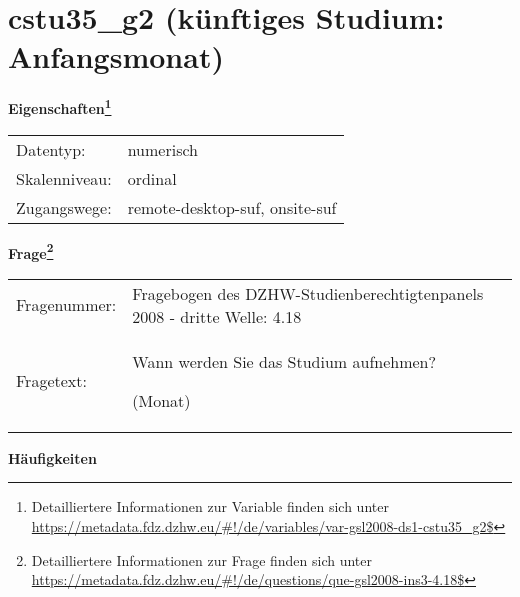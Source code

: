 
    \setcounter{footnote}{0}

    \vspace*{-1.8cm}
	\section{cstu35\_g2 (künftiges Studium: Anfangsmonat)}
	\label{section:cstu35_g2}



    \vspace*{0.5cm}
    \noindent\textbf{Eigenschaften\footnote{Detailliertere Informationen zur Variable finden sich unter
		\url{https://metadata.fdz.dzhw.eu/\#!/de/variables/var-gsl2008-ds1-cstu35_g2$}}}\\
	\begin{tabularx}{\hsize}{@{}lX}
	Datentyp: & numerisch \\
	Skalenniveau: & ordinal \\
	Zugangswege: &
	  remote-desktop-suf, 
	  onsite-suf
 \\
    \end{tabularx}



				\vspace*{0.5cm}
                \noindent\textbf{Frage\footnote{Detailliertere Informationen zur Frage finden sich unter
		              \url{https://metadata.fdz.dzhw.eu/\#!/de/questions/que-gsl2008-ins3-4.18$}}}\\
				\begin{tabularx}{\hsize}{@{}lX}
					Fragenummer: &
					  Fragebogen des DZHW-Studienberechtigtenpanels 2008 - dritte Welle:
					  4.18
 \\
					Fragetext: & Wann werden Sie das Studium aufnehmen?\par  (Monat) \\
				\end{tabularx}





        		\vspace*{0.5cm}
                \noindent\textbf{Häufigkeiten}

